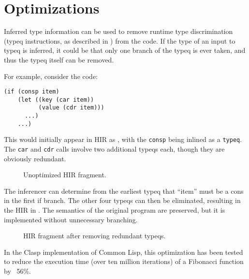 \section{Optimizations}

Inferred type information can be used to remove runtime type
discrimination (typeq instructions, as described in )
from the code. If the type of an input to typeq is inferred, it could
be that only one branch of the typeq is ever taken, and thus the typeq
itself can be removed.

For example, consider the code:

\begin{verbatim}
(if (consp item)
    (let ((key (car item))
          (value (cdr item)))
      ...)
    ...)
\end{verbatim}

This would initially appear in HIR as ,
with the \texttt{consp} being inlined as a \texttt{typeq}. The
\texttt{car} and \texttt{cdr} calls involve two additional typeqs
each, though they are obviously redundant.

\begin{figure}
\begin{center}
\end{center}
\caption{\label{fig-unoptimized}
Unoptimized HIR fragment.}
\end{figure}

The inferencer can determine from the earliest typeq that ``item'' must
be a cons in the first if branch. The other four typeqs can then be
eliminated, resulting in the HIR in . The
semantics of the original program are preserved, but it is implemented
without unnecessary branching.

\begin{figure}
\begin{center}
\end{center}
\caption{\label{fig-optimized}
HIR fragment after removing redundant typeqs.}
\end{figure}

In the Clasp implementation of Common Lisp, this optimization has been
tested to reduce the execution time (over ten million iterations) of a
Fibonacci function by ~56\%.
